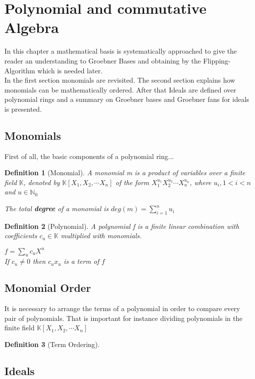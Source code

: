 \section{Polynomial and commutative Algebra}

In this chapter a mathematical basis is systematically approached to give the reader an understanding to Groebner Bases and obtaining by the Flipping-Algorithm which is needed later.\\
In the first section monomials are revisited.
The second section explains how monomials can be mathematically ordered.
After that Ideals are defined over polynomial rings and a summary on Groebner bases and Groebner fans for ideals is presented.

\subsection{Monomials}
\newtheorem{env_definition}{Definition}[section]

First of all, the basic components of a polynomial ring...

\begin{env_definition}[Monomial] 

A monomial m is a product of variables over a finite field $\mathbb{K}$, denoted by $ \mathbb{K} \left[X_{1},X_{2},\cdots X_{n}\right]  $ of the form $X_{1}^{u_{1}}X_{2}^{u_{2}}\cdots X_{n}^{u_{n}}$, where $u_{i}, 1 < i < n $ and $u \in \mathbb{N}_{0} $

The total \textbf{degree} of a monomial is $deg(m) = \sum_{i=1}^n u_i $ 
\end{env_definition}

\begin{env_definition}[Polynomial]

A polynomial f is a finite linear combination with coefficients $c_{u} \in \mathbb{K}$ multiplied with monomials.

$ f = \sum_{u} c_{u}X^{u}$\\

If $c_{u}\neq0$ then $c_{u}x_{u}$ is a term of $f$


\end{env_definition}


\subsection{Monomial Order}

It is necessary to arrange the terms of a polynomial in order to compare every pair of polynomials. That is important for instance dividing polynomials in the finite field
$ \mathbb{K} \left[X_{1},X_{2},\cdots X_{n}\right]  $

\begin{env_definition}[Term Ordering] 



\end{env_definition}


\subsection{Ideals}



\newpage